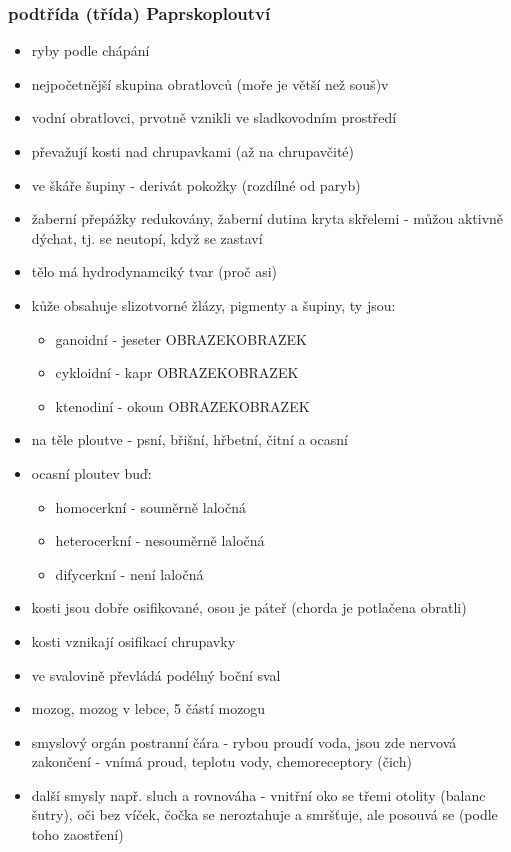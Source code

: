 \documentclass{article}
\begin{document}
\subsubsection{podtřída (třída) Paprskoploutví}
\begin{itemize}
  \item ryby podle  chápání
  \item nejpočetnější skupina obratlovců (moře je větší než souš)v
  \item vodní obratlovci, prvotně vznikli ve sladkovodním prostředí
  \item převažují kosti nad chrupavkami (až na chrupavčité)
  \item ve škáře šupiny - derivát pokožky (rozdílné od paryb)
  \item žaberní přepážky redukovány, žaberní dutina kryta skřelemi - můžou aktivně dýchat, tj. se neutopí, když se zastaví
  \item tělo má hydrodynamciký tvar (proč asi)
  \item kůže obsahuje slizotvorné žlázy, pigmenty a šupiny, ty jsou:
  \begin{itemize}
    \item ganoidní - jeseter OBRAZEKOBRAZEK
    \item cykloidní - kapr OBRAZEKOBRAZEK
    \item ktenodiní - okoun OBRAZEKOBRAZEK
  \end{itemize}
  \item na těle ploutve - psní, břišní, hřbetní, čitní a ocasní
  \item ocasní ploutev buď:
  \begin{itemize}
    \item homocerkní - souměrně laločná
    \item heterocerkní - nesouměrně laločná
    \item difycerkní - není laločná
  \end{itemize}
  \item kosti jsou dobře osifikované, osou je páteř (chorda je potlačena obratli)
  \item kosti vznikají osifikací chrupavky
  \item ve svalovině převládá podélný boční sval
  \item mozog, mozog v lebce, 5 částí mozogu
  \item smyslový orgán postranní čára - rybou proudí voda, jsou zde nervová zakončení - vnímá proud, teplotu vody, chemoreceptory (čich)
  \item další smysly např. sluch a rovnováha - vnitřní oko se třemi otolity (balanc šutry), oči bez víček, čočka se neroztahuje a smršťuje, ale posouvá se (podle toho zaostření)

\end{itemize}
\end{document}
